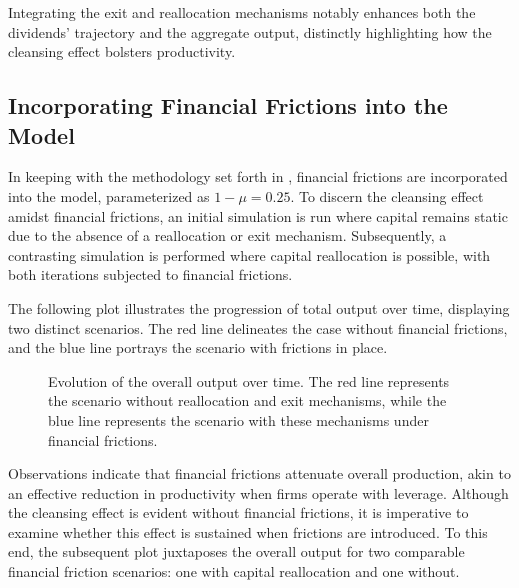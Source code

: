 \documentclass[12pt]{report}
\begin{document}
Integrating the exit and reallocation mechanisms notably enhances both the dividends' trajectory and the aggregate
output, distinctly highlighting how the cleansing effect bolsters productivity. 


\subsection{Incorporating Financial Frictions into the Model}


In keeping with the methodology set forth in \cite{OsePap17}, financial frictions are incorporated into the model,
parameterized as  \(1-\mu = 0.25\). To discern the cleansing effect amidst financial frictions, an initial simulation is
run where capital remains static due to the absence of a reallocation or exit mechanism. Subsequently, a contrasting
simulation is performed where capital reallocation is possible, with both iterations subjected to financial frictions.

The following plot illustrates the progression of total output over time, displaying two distinct scenarios. The red
line delineates the case without financial frictions, and the blue line portrays the scenario with frictions in place.

\begin{figure}[H]
    \centering
    \caption{Evolution of the overall output over time. The red line represents the scenario without reallocation and
    exit mechanisms, 
     while the blue line represents the scenario with these mechanisms under financial frictions.}
    \label{fig:output_evolution_frictions}
\end{figure}

Observations indicate that financial frictions attenuate overall production, akin to an effective reduction in
productivity when firms operate with leverage. Although the cleansing effect is evident without financial frictions, it
is imperative to examine whether this effect is sustained when frictions are introduced. To this end, the subsequent plot
juxtaposes the overall output for two comparable financial friction scenarios: one with capital reallocation and one
without.
\end{document}
